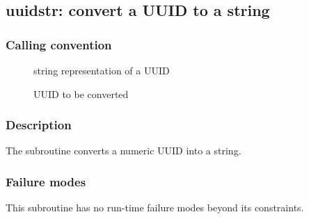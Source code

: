 \clearpage
{}
{}
\label{subr:uuidstr}
\subsection*{uuidstr: convert a UUID to a string}

\subsubsection*{Calling convention}

\begin{description}
\item[] string representation of a UUID
\item[] UUID to be converted
\end{description}

\subsubsection*{Description}

The  subroutine converts a numeric UUID into a string.

\subsubsection*{Failure modes}

This subroutine has no run-time failure modes beyond its constraints.
